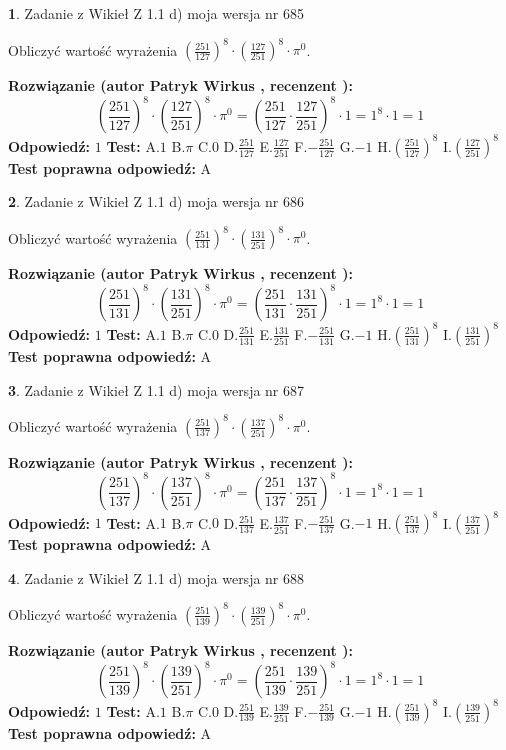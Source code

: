 \documentclass[12pt, a4paper]{article}
\theoremstyle{definition} %
\newtheorem{zad}{}
\newcommand{\zadStart}[1]{\begin{zad}#1\newline}
\newcommand{\zadStop}{\end{zad}}
\newcommand{\rozwStart}[2]{\noindent \textbf{Rozwiązanie (autor #1 , recenzent #2): }\newline}
\newcommand{\rozwStop}{\newline}
\newcommand{\odpStart}{\noindent \textbf{Odpowiedź:}\newline}
\newcommand{\odpStop}{\newline}
\newcommand{\testStart}{\noindent \textbf{Test:}\newline}
\newcommand{\testStop}{\newline}
\newcommand{\kluczStart}{\noindent \textbf{Test poprawna odpowiedź:}\newline}
\newcommand{\kluczStop}{\newline}
\begin{document}
\zadStart{Zadanie z Wikieł Z 1.1 d) moja wersja nr 685}

Obliczyć wartość wyrażenia $(\frac{251}{127})^{8} \cdot (\frac{127}{251})^{8} \cdot \pi^{0}$.
\zadStop
\rozwStart{Patryk Wirkus}{}
$$(\frac{251}{127})^{8} \cdot (\frac{127}{251})^{8} \cdot \pi^{0} = (\frac{251}{127} \cdot \frac{127}{251})^{8} \cdot 1 = 1^{8} \cdot 1 = 1$$
\rozwStop
\odpStart
$1$
\odpStop
\testStart
A.$1$ B.$\pi$ C.$0$ D.$\frac{251}{127}$ E.$\frac{127}{251}$
F.$-\frac{251}{127}$ G.$-1$
H.$(\frac{251}{127})^{8}$
I.$(\frac{127}{251})^{8}$
\testStop
\kluczStart
A
\kluczStop



\zadStart{Zadanie z Wikieł Z 1.1 d) moja wersja nr 686}

Obliczyć wartość wyrażenia $(\frac{251}{131})^{8} \cdot (\frac{131}{251})^{8} \cdot \pi^{0}$.
\zadStop
\rozwStart{Patryk Wirkus}{}
$$(\frac{251}{131})^{8} \cdot (\frac{131}{251})^{8} \cdot \pi^{0} = (\frac{251}{131} \cdot \frac{131}{251})^{8} \cdot 1 = 1^{8} \cdot 1 = 1$$
\rozwStop
\odpStart
$1$
\odpStop
\testStart
A.$1$ B.$\pi$ C.$0$ D.$\frac{251}{131}$ E.$\frac{131}{251}$
F.$-\frac{251}{131}$ G.$-1$
H.$(\frac{251}{131})^{8}$
I.$(\frac{131}{251})^{8}$
\testStop
\kluczStart
A
\kluczStop



\zadStart{Zadanie z Wikieł Z 1.1 d) moja wersja nr 687}

Obliczyć wartość wyrażenia $(\frac{251}{137})^{8} \cdot (\frac{137}{251})^{8} \cdot \pi^{0}$.
\zadStop
\rozwStart{Patryk Wirkus}{}
$$(\frac{251}{137})^{8} \cdot (\frac{137}{251})^{8} \cdot \pi^{0} = (\frac{251}{137} \cdot \frac{137}{251})^{8} \cdot 1 = 1^{8} \cdot 1 = 1$$
\rozwStop
\odpStart
$1$
\odpStop
\testStart
A.$1$ B.$\pi$ C.$0$ D.$\frac{251}{137}$ E.$\frac{137}{251}$
F.$-\frac{251}{137}$ G.$-1$
H.$(\frac{251}{137})^{8}$
I.$(\frac{137}{251})^{8}$
\testStop
\kluczStart
A
\kluczStop



\zadStart{Zadanie z Wikieł Z 1.1 d) moja wersja nr 688}

Obliczyć wartość wyrażenia $(\frac{251}{139})^{8} \cdot (\frac{139}{251})^{8} \cdot \pi^{0}$.
\zadStop
\rozwStart{Patryk Wirkus}{}
$$(\frac{251}{139})^{8} \cdot (\frac{139}{251})^{8} \cdot \pi^{0} = (\frac{251}{139} \cdot \frac{139}{251})^{8} \cdot 1 = 1^{8} \cdot 1 = 1$$
\rozwStop
\odpStart
$1$
\odpStop
\testStart
A.$1$ B.$\pi$ C.$0$ D.$\frac{251}{139}$ E.$\frac{139}{251}$
F.$-\frac{251}{139}$ G.$-1$
H.$(\frac{251}{139})^{8}$
I.$(\frac{139}{251})^{8}$
\testStop
\kluczStart
A
\kluczStop
\end{document}
